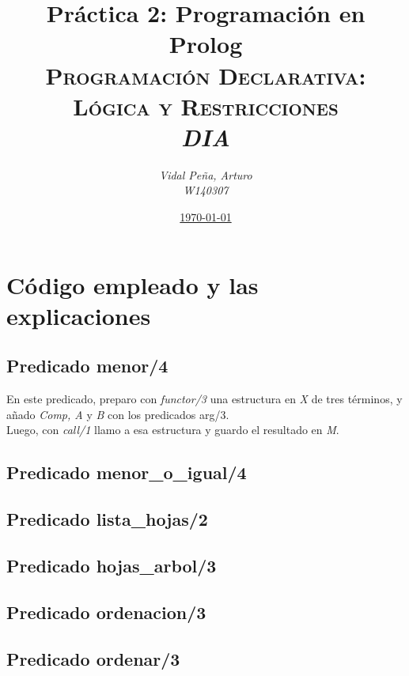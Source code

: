 \documentclass[12pt, a4paper, spanish]{article}
\title{\textbf{Práctica 2: Programación en Prolog} \\
	\textsc{Programación Declarativa: Lógica y Restricciones} \\
	\emph{DIA}}
\author{\emph{Vidal Peña, Arturo}\\
		\emph{W140307}}
\date{\underline{\today}}
\begin{document}
	
\maketitle
\thispagestyle{empty}
\renewcommand*\contentsname{Índice de contenidos}
\tableofcontents
\pagebreak


\section{Código empleado y las explicaciones}

\subsection{Predicado menor/4}

En este predicado, preparo con \emph{functor/3} una estructura en \emph{X} de tres términos, y añado \emph{Comp, A} y \emph{B} con los predicados arg/3.\\
Luego, con \emph{call/1} llamo a esa estructura y guardo el resultado en \emph{M}.

\subsection{Predicado menor\_o\_igual/4}



\subsection{Predicado lista\_hojas/2}



\subsection{Predicado hojas\_arbol/3}



\subsection{Predicado ordenacion/3}



\subsection{Predicado ordenar/3}

\end{document}
